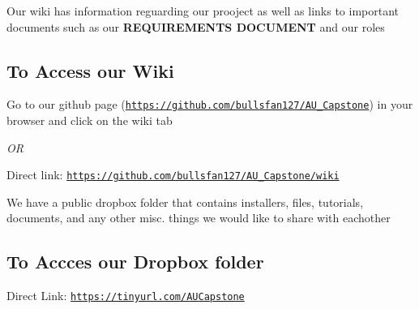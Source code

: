 

 Our wiki has information reguarding our prooject as well as links to important documents such as our {\bfseries R\-E\-Q\-U\-I\-R\-E\-M\-E\-N\-T\-S D\-O\-C\-U\-M\-E\-N\-T} and our roles 



\subsection*{To Access our Wiki}


\begin{DoxyEnumerate}
\item Go to our github page (\href{https://github.com/bullsfan127/AU_Capstone}{\tt https\-://github.\-com/bullsfan127/\-A\-U\-\_\-\-Capstone}) in your browser and click on the wiki tab
\end{DoxyEnumerate}

{\itshape O\-R}


\begin{DoxyEnumerate}
\item Direct link\-: \href{https://github.com/bullsfan127/AU_Capstone/wiki}{\tt https\-://github.\-com/bullsfan127/\-A\-U\-\_\-\-Capstone/wiki}
\end{DoxyEnumerate}

\par
 

 We have a public dropbox folder that contains installers, files, tutorials, documents, and any other misc. things we would like to share with eachother 



\subsection*{To Accces our Dropbox folder}

Direct Link\-: \href{https://tinyurl.com/AUCapstone}{\tt https\-://tinyurl.\-com/\-A\-U\-Capstone} 